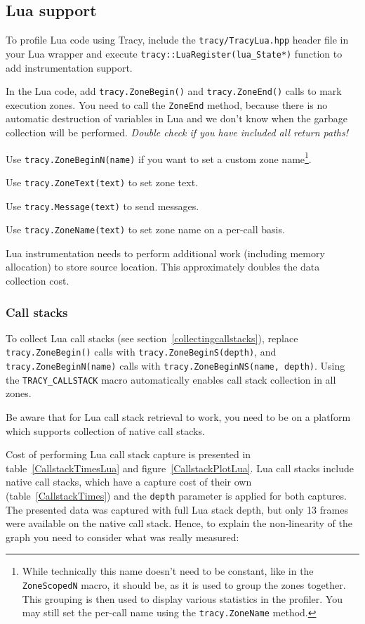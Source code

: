 \documentclass[hidelinks,titlepage,a4paper]{article}
\begin{document}
\subsection{Lua support}

To profile Lua code using Tracy, include the \texttt{tracy/TracyLua.hpp} header file in your Lua wrapper and execute \texttt{tracy::LuaRegister(lua\_State*)} function to add instrumentation support.

In the Lua code, add \texttt{tracy.ZoneBegin()} and \texttt{tracy.ZoneEnd()} calls to mark execution zones. You need to call the \texttt{ZoneEnd} method, because there is no automatic destruction of variables in Lua and we don't know when the garbage collection will be performed. \emph{Double check if you have included all return paths!}

Use \texttt{tracy.ZoneBeginN(name)} if you want to set a custom zone name\footnote{While technically this name doesn't need to be constant, like in the \texttt{ZoneScopedN} macro, it should be, as it is used to group the zones together. This grouping is then used to display various statistics in the profiler. You may still set the per-call name using the \texttt{tracy.ZoneName} method.}.

Use \texttt{tracy.ZoneText(text)} to set zone text.

Use \texttt{tracy.Message(text)} to send messages.

Use \texttt{tracy.ZoneName(text)} to set zone name on a per-call basis.

Lua instrumentation needs to perform additional work (including memory allocation) to store source location. This approximately doubles the data collection cost.

\subsubsection{Call stacks}

To collect Lua call stacks (see section~\ref{collectingcallstacks}), replace \texttt{tracy.ZoneBegin()} calls with \texttt{tracy.ZoneBeginS(depth)}, and \texttt{tracy.ZoneBeginN(name)} calls with \texttt{tracy.ZoneBeginNS(name, depth)}. Using the \texttt{TRACY\_CALLSTACK} macro automatically enables call stack collection in all zones.

Be aware that for Lua call stack retrieval to work, you need to be on a platform which supports collection of native call stacks.

Cost of performing Lua call stack capture is presented in table~\ref{CallstackTimesLua} and figure~\ref{CallstackPlotLua}. Lua call stacks include native call stacks, which have a capture cost of their own (table~\ref{CallstackTimes}) and the \texttt{depth} parameter is applied for both captures. The presented data was captured with full Lua stack depth, but only 13 frames were available on the native call stack. Hence, to explain the non-linearity of the graph you need to consider what was really measured:
\end{document}
